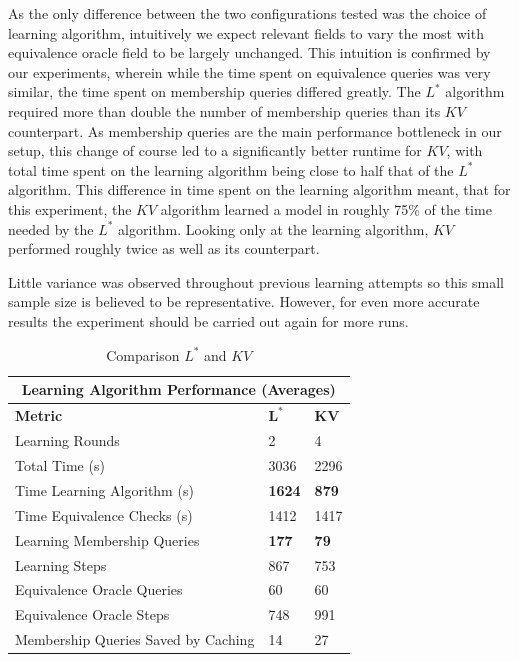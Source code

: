 As the only difference between the two configurations tested was the choice of learning algorithm, intuitively we expect relevant fields to vary the most with equivalence oracle field to be largely unchanged. This intuition is confirmed by our experiments, wherein while the time spent on equivalence queries was very similar, the time spent on membership queries differed greatly. The $L^*$ algorithm required more than double the number of membership queries than its $KV$ counterpart. As membership queries are the main performance bottleneck in our setup, this change of course led to a significantly better runtime for $KV$, with total time spent on the learning algorithm being close to half that of the $L^*$ algorithm. This difference in time spent on the learning algorithm meant, that for this experiment, the $KV$ algorithm learned a model in roughly 75\% of the time needed by the $L^*$ algorithm. Looking only at the learning algorithm, $KV$ performed roughly twice as well as its counterpart.

Little variance was observed throughout previous learning attempts so this small sample size is believed to be representative. However, for even more accurate results the experiment should be carried out again for more runs. 


\begin{table}[t]
	\centering
	\begin{tabular}{ |p{6.5cm}||p{1cm}|p{1cm}|  }
		\hline
		\multicolumn{3}{|c|}{\textbf{Learning Algorithm Performance (Averages)}} \\
		\hline
		\textbf{Metric} & $\mathbf{L^*}$ & $\mathbf{KV}$ \\
		\hline
		Learning Rounds							&	2				&	4 				\\
		Total Time (s)							&   3036			& 	2296   			\\
		Time Learning Algorithm	(s)				&	\textbf{1624}	& 	\textbf{879}	\\
		Time Equivalence Checks (s)				& 	1412			& 	1417			\\
		Learning Membership Queries 			&   \textbf{177}	& 	\textbf{79}		\\
		Learning Steps							& 	867	  			& 	753   			\\
		Equivalence Oracle Queries				& 	60  			&  	60				\\
		Equivalence Oracle Steps				& 	748  			&  	991				\\
		Membership Queries Saved by Caching		& 	14  			&  	27				\\
		\hline
	\end{tabular}
	\caption{Comparison $L^*$ and $KV$}
	\label{tab:compkvlstar}
\end{table}

